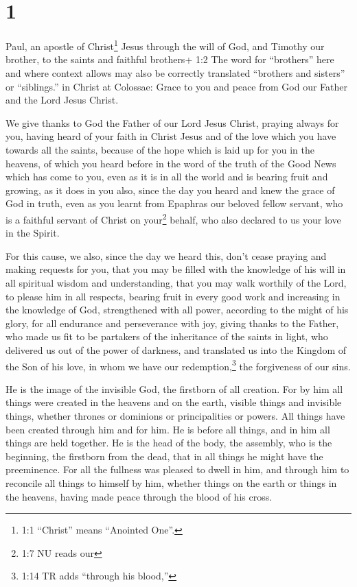 \hypertarget{section}{%
\section{1}\label{section}}

 Paul, an apostle of Christ\footnote{1:1 ``Christ'' means
  ``Anointed One''.} Jesus through the will of God, and Timothy our
brother,  to the saints and faithful brothers+ 1:2 The word
for ``brothers'' here and where context allows may also be correctly
translated ``brothers and sisters'' or ``siblings.'' in Christ at
Colossae: Grace to you and peace from God our Father and the Lord Jesus
Christ.

 We give thanks to God the Father of our Lord Jesus Christ,
praying always for you,  having heard of your faith in
Christ Jesus and of the love which you have towards all the saints,
 because of the hope which is laid up for you in the
heavens, of which you heard before in the word of the truth of the Good
News  which has come to you, even as it is in all the world
and is bearing fruit and growing, as it does in you also, since the day
you heard and knew the grace of God in truth,  even as you
learnt from Epaphras our beloved fellow servant, who is a faithful
servant of Christ on your\footnote{1:7 NU reads our} behalf,
 who also declared to us your love in the Spirit.

 For this cause, we also, since the day we heard this, don't
cease praying and making requests for you, that you may be filled with
the knowledge of his will in all spiritual wisdom and understanding,
 that you may walk worthily of the Lord, to please him in
all respects, bearing fruit in every good work and increasing in the
knowledge of God,  strengthened with all power, according
to the might of his glory, for all endurance and perseverance with joy,
 giving thanks to the Father, who made us fit to be
partakers of the inheritance of the saints in light,  who
delivered us out of the power of darkness, and translated us into the
Kingdom of the Son of his love,  in whom we have our
redemption,\footnote{1:14 TR adds ``through his blood,''} the
forgiveness of our sins.

 He is the image of the invisible God, the firstborn of all
creation.  For by him all things were created in the
heavens and on the earth, visible things and invisible things, whether
thrones or dominions or principalities or powers. All things have been
created through him and for him.  He is before all things,
and in him all things are held together.  He is the head of
the body, the assembly, who is the beginning, the firstborn from the
dead, that in all things he might have the preeminence. 
For all the fullness was pleased to dwell in him,  and
through him to reconcile all things to himself by him, whether things on
the earth or things in the heavens, having made peace through the blood
of his cross.

